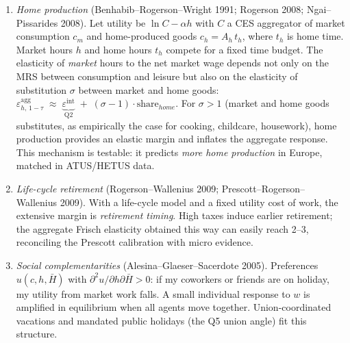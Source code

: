 \documentclass[11pt,a4paper]{article}
\begin{document}
\begin{enumerate}[leftmargin=*,itemsep=2pt]
    \item \emph{Home production} (Benhabib--Rogerson--Wright 1991; Rogerson 2008; Ngai--Pissarides 2008). Let utility be $\ln C - \alpha h$ with $C$ a CES aggregator of market consumption $c_m$ and home-produced goods $c_h=A_h\,t_h$, where $t_h$ is home time. Market hours $h$ and home hours $t_h$ compete for a fixed time budget. The elasticity of \emph{market} hours to the net market wage depends not only on the MRS between consumption and leisure but also on the elasticity of substitution $\sigma$ between market and home goods:
    $\varepsilon^{\text{agg}}_{h,\,1-\tau}\;\approx\;\underbrace{\varepsilon^{\text{int}}}_{\text{Q2}}\;+\;(\sigma-1)\cdot\text{share}_{home}.$
    For $\sigma>1$ (market and home goods substitutes, as empirically the case for cooking, childcare, housework), home production provides an elastic margin and inflates the aggregate response. This mechanism is testable: it predicts \emph{more home production} in Europe, matched in ATUS/HETUS data.

    \item \emph{Life-cycle retirement} (Rogerson--Wallenius 2009; Prescott--Rogerson--Wallenius 2009). With a life-cycle model and a fixed utility cost of work, the extensive margin is \emph{retirement timing}. High taxes induce earlier retirement; the aggregate Frisch elasticity obtained this way can easily reach 2--3, reconciling the Prescott calibration with micro evidence.

    \item \emph{Social complementarities} (Alesina--Glaeser--Sacerdote 2005). Preferences $u(c,h,\bar H)$ with $\partial^2 u/\partial h\partial\bar H > 0$: if my coworkers or friends are on holiday, my utility from market work falls. A small individual response to $w$ is amplified in equilibrium when all agents move together. Union-coordinated vacations and mandated public holidays (the Q5 union angle) fit this structure.
\end{enumerate}
\end{document}
